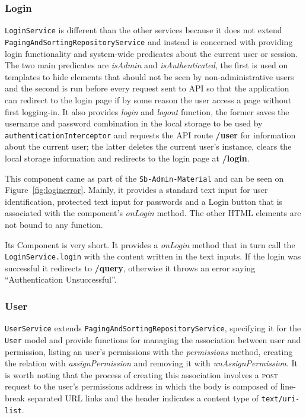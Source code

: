 \subsubsection{Login}
\texttt{LoginService} is different than the other services because it does not extend \texttt{PagingAndSortingRepositoryService} and instead is concerned with providing login functionality and system-wide predicates about the current user or session. The two main predicates are \textit{isAdmin} and \textit{isAuthenticated}, the first is used on templates to hide elements that should not be seen by non-administrative users and the second is run before every request sent to \gls{API} so that the application can redirect to the login page if by some reason the user access a page without first logging-in. It also provides \textit{login} and \textit{logout} function, the former saves the username and password combination in the local storage to be used by \texttt{authenticationInterceptor} and requests the \gls{API} route \textbf{/user} for information about the current user; the latter deletes the current user's instance, clears the local storage information and redirects to the login page at \textbf{/login}.

This component came as part of the \texttt{Sb-Admin-Material} and can be seen on Figure~\ref{fig:loginerror}. Mainly, it provides a standard text input for user identification, protected text input for passwords and a Login button that is associated with the component's \textit{onLogin} method. The other \gls{HTML} elements are not bound to any function.

Its Component is very short. It provides a \textit{onLogin} method that in turn call the \texttt{LoginService.login} with the content written in the text inputs. If the login was successful it redirects to \textbf{/query}, otherwise it throws an error saying ``Authentication Unsuccessful''.

\subsubsection{User}
\texttt{UserService} extends \texttt{PagingAndSortingRepositoryService}, specifying it for the \texttt{User} model and provide functions for managing the association between user and permission, listing an user's permissions with the \textit{permissions} method, creating the relation with \textit{assignPermission} and removing it with \textit{unAssignPermission}. It is worth noting that the process of creating this association involves a \textsc{post} request to the user's permissions address in which the body is composed of line-break separated \gls{URL} links and the header indicates a content type of \texttt{text/uri-list}.

